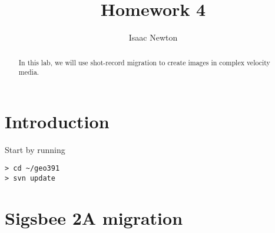 \author{Isaac Newton}
\title{Homework 4}

\begin{abstract}
In this lab, we will use shot-record migration to create 
images in complex velocity media.
\end{abstract}


\section{Introduction}

Start by running
\begin{verbatim}
> cd ~/geo391
> svn update
\end{verbatim}

\section{Sigsbee 2A migration}

